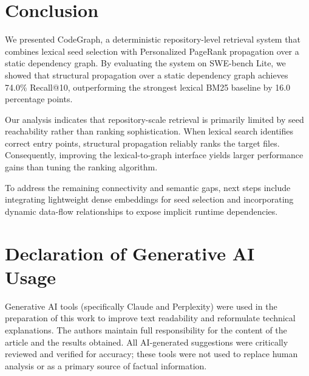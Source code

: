 \section{Conclusion}
\label{sec:conclusion}

We presented CodeGraph, a deterministic repository-level retrieval system that combines lexical seed selection with Personalized PageRank propagation over a static dependency graph. By evaluating the system on SWE-bench Lite, we showed that structural propagation over a static dependency graph achieves 74.0\% Recall@10, outperforming the strongest lexical BM25 baseline by 16.0 percentage points.

Our analysis indicates that repository-scale retrieval is primarily limited by seed reachability rather than ranking sophistication. When lexical search identifies correct entry points, structural propagation reliably ranks the target files. Consequently, improving the lexical-to-graph interface yields larger performance gains than tuning the ranking algorithm. 

To address the remaining connectivity and semantic gaps, next steps include integrating lightweight dense embeddings for seed selection and incorporating dynamic data-flow relationships to expose implicit runtime dependencies.

\section*{Declaration of Generative AI Usage}
Generative AI tools (specifically Claude and Perplexity) were used in the preparation of this work to improve text readability and reformulate technical explanations. The authors maintain full responsibility for the content of the article and the results obtained. All AI-generated suggestions were critically reviewed and verified for accuracy; these tools were not used to replace human analysis or as a primary source of factual information.

